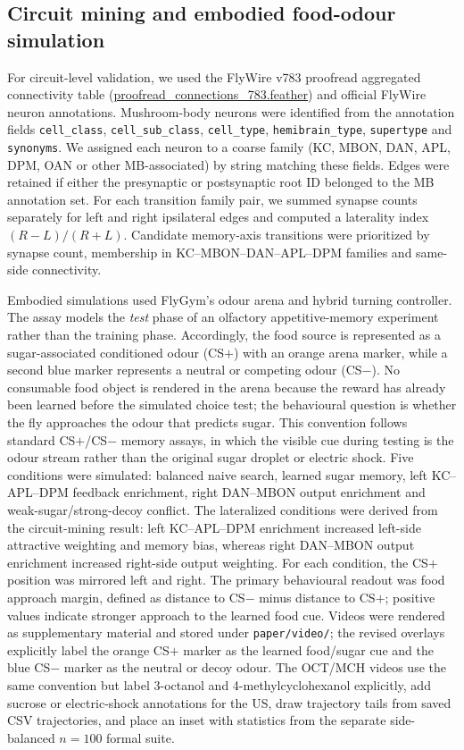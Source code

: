 \documentclass[10pt]{article}
\begin{document}
\subsection*{Circuit mining and embodied food-odour simulation}
For circuit-level validation, we used the FlyWire v783 proofread aggregated connectivity table (\url{proofread_connections_783.feather}) and official FlyWire neuron annotations. Mushroom-body neurons were identified from the annotation fields \texttt{cell\_class}, \texttt{cell\_sub\_class}, \texttt{cell\_type}, \texttt{hemibrain\_type}, \texttt{supertype} and \texttt{synonyms}. We assigned each neuron to a coarse family (KC, MBON, DAN, APL, DPM, OAN or other MB-associated) by string matching these fields. Edges were retained if either the presynaptic or postsynaptic root ID belonged to the MB annotation set. For each transition family pair, we summed synapse counts separately for left and right ipsilateral edges and computed a laterality index $(R-L)/(R+L)$. Candidate memory-axis transitions were prioritized by synapse count, membership in KC--MBON--DAN--APL--DPM families and same-side connectivity.

Embodied simulations used FlyGym's odour arena and hybrid turning controller. The assay models the \textit{test} phase of an olfactory appetitive-memory experiment rather than the training phase. Accordingly, the food source is represented as a sugar-associated conditioned odour (CS$+$) with an orange arena marker, while a second blue marker represents a neutral or competing odour (CS$-$). No consumable food object is rendered in the arena because the reward has already been learned before the simulated choice test; the behavioural question is whether the fly approaches the odour that predicts sugar. This convention follows standard CS$+$/CS$-$ memory assays, in which the visible cue during testing is the odour stream rather than the original sugar droplet or electric shock. Five conditions were simulated: balanced naive search, learned sugar memory, left KC--APL--DPM feedback enrichment, right DAN--MBON output enrichment and weak-sugar/strong-decoy conflict. The lateralized conditions were derived from the circuit-mining result: left KC--APL--DPM enrichment increased left-side attractive weighting and memory bias, whereas right DAN--MBON output enrichment increased right-side output weighting. For each condition, the CS$+$ position was mirrored left and right. The primary behavioural readout was food approach margin, defined as distance to CS$-$ minus distance to CS$+$; positive values indicate stronger approach to the learned food cue. Videos were rendered as supplementary material and stored under \texttt{paper/video/}; the revised overlays explicitly label the orange CS$+$ marker as the learned food/sugar cue and the blue CS$-$ marker as the neutral or decoy odour. The OCT/MCH videos use the same convention but label 3-octanol and 4-methylcyclohexanol explicitly, add sucrose or electric-shock annotations for the US, draw trajectory tails from saved CSV trajectories, and place an inset with statistics from the separate side-balanced $n=100$ formal suite.
\end{document}
